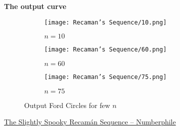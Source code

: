 \textbf{The output curve}
\begin{figure}[H]
	\centering
	\begin{subfigure}{0.3\linewidth}
		\texttt{[image: Recaman's Sequence/10.png]}
		\caption{$n=10$}
	\end{subfigure}
	\begin{subfigure}{0.3\linewidth}
		\texttt{[image: Recaman's Sequence/60.png]}
		\caption{$n=60$}
	\end{subfigure}
	\begin{subfigure}{0.3\linewidth}
		\texttt{[image: Recaman's Sequence/75.png]}
		\caption{$n=75$}
	\end{subfigure}
	\caption{Output Ford Circles for few $n$}
\end{figure}
\begin{funvideo}
	\href{https://youtu.be/FGC5TdIiT9U}{The Slightly Spooky Recamán Sequence -- Numberphile}
\end{funvideo}
\recalctypearea